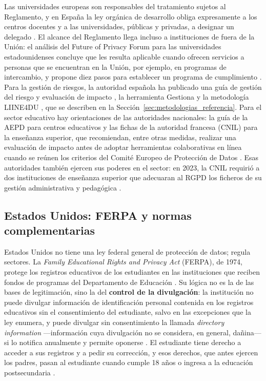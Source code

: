 Las universidades europeas son responsables del tratamiento sujetos al Reglamento, y en España la ley orgánica de desarrollo obliga expresamente a los centros docentes y a las universidades, públicas y privadas, a designar un delegado \cite[art.~34]{lopdgdd2018}. El alcance del Reglamento llega incluso a instituciones de fuera de la Unión: el análisis del Future of Privacy Forum para las universidades estadounidenses concluye que les resulta aplicable cuando ofrecen servicios a personas que se encuentran en la Unión, por ejemplo, en programas de intercambio, y propone diez pasos para establecer un programa de cumplimiento \cite{fpf2020gdpr}. Para la gestión de riesgos, la autoridad española ha publicado una guía de gestión del riesgo y evaluación de impacto \cite{aepd2021riesgo}, la herramienta Gestiona \cite{aepd2024gestiona} y la metodología LIINE4DU \cite{aepd2024liine4du}, que se describen en la Sección~\ref{sec:metodologias_referencia}. Para el sector educativo hay orientaciones de las autoridades nacionales: la guía de la AEPD para centros educativos \cite{aepd2018centros} y las fichas de la autoridad francesa (CNIL) para la enseñanza superior, que recomiendan, entre otras medidas, realizar una evaluación de impacto antes de adoptar herramientas colaborativas en línea cuando se reúnen los criterios del Comité Europeo de Protección de Datos \cite{cnil2026superieur}. Esas autoridades también ejercen sus poderes en el sector: en 2023, la CNIL requirió a dos instituciones de enseñanza superior que adecuaran al RGPD los ficheros de su gestión administrativa y pedagógica \cite{cnil2023miseendemeure}.

\subsection{Estados Unidos: FERPA y normas complementarias}
\label{sec:marco_ferpa}

Estados Unidos no tiene una ley federal general de protección de datos; regula sectores. La \textit{Family Educational Rights and Privacy Act} (FERPA), de 1974, protege los registros educativos de los estudiantes en las instituciones que reciben fondos de programas del Departamento de Educación \cite{ferpa1974,ferpa34cfr}. Su lógica no es la de las bases de legitimación, sino la del \textbf{control de la divulgación}: la institución no puede divulgar información de identificación personal contenida en los registros educativos sin el consentimiento del estudiante, salvo en las excepciones que la ley enumera, y puede divulgar sin consentimiento la llamada \textit{directory information} ---información cuya divulgación no se considera, en general, dañina--- si lo notifica anualmente y permite oponerse \cite{ferpa1974,ferpa34cfr,nces2004privacy}. El estudiante tiene derecho a acceder a sus registros y a pedir su corrección, y esos derechos, que antes ejercen los padres, pasan al estudiante cuando cumple 18 años o ingresa a la educación postsecundaria \cite{ferpa34cfr}.

